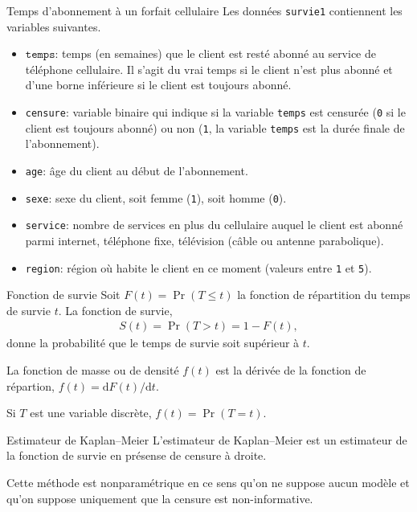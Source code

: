 \documentclass[
  ignorenonframetext,
]{beamer}
\providecommand{\tightlist}{%
  \setlength{\itemsep}{0pt}\setlength{\parskip}{0pt}}
\begin{document}
\begin{frame}[fragile]{Temps d'abonnement à un forfait cellulaire}
\protect{}\label{temps-dabonnement-uxe0-un-forfait-cellulaire}
Les données \texttt{survie1} contiennent les variables suivantes.

\begin{itemize}
\tightlist
\item
  \(\texttt{temps}\): temps (en semaines) que le client est resté abonné
  au service de téléphone cellulaire. Il s'agit du vrai temps si le
  client n'est plus abonné et d'une borne inférieure si le client est
  toujours abonné.
\item
  \texttt{censure}: variable binaire qui indique si la variable
  \texttt{temps} est censurée (\texttt{0} si le client est toujours
  abonné) ou non (\texttt{1}, la variable \texttt{temps} est la durée
  finale de l'abonnement).
\item
  \texttt{age}: âge du client au début de l'abonnement.
\item
  \texttt{sexe}: sexe du client, soit femme (\texttt{1}), soit homme
  (\texttt{0}).
\item
  \texttt{service}: nombre de services en plus du cellulaire auquel le
  client est abonné parmi internet, téléphone fixe, télévision (câble ou
  antenne parabolique).
\item
  \texttt{region}: région où habite le client en ce moment (valeurs
  entre \texttt{1} et \texttt{5}).
\end{itemize}
\end{frame}

\begin{frame}{Fonction de survie}
\protect{}\label{fonction-de-survie}
Soit \(F(t)=\Pr(T \leq t)\) la fonction de répartition du temps de
survie \(t\). La fonction de survie, \begin{align*}
S(t)= \Pr(T > t) = 1-F(t),
\end{align*} donne la probabilité que le temps de survie soit supérieur
à \(t\).

La fonction de masse ou de densité \(f(t)\) est la dérivée de la
fonction de répartion, \(f(t) = \mathrm{d} F(t)/{\mathrm{d} t}\).

Si \(T\) est une variable discrète, \(f(t)=\Pr(T=t).\)
\end{frame}

\begin{frame}{Estimateur de Kaplan--Meier}
\protect{}\label{estimateur-de-kaplanmeier}
L'estimateur de Kaplan--Meier est un estimateur de la fonction de survie
en présense de censure à droite.

Cette méthode est nonparamétrique en ce sens qu'on ne suppose aucun
modèle et qu'on suppose uniquement que la censure est non-informative.
\end{frame}
\end{document}

